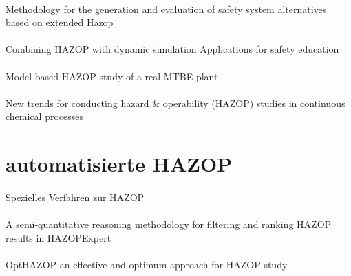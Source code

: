 \paragraph*{\cite{Ramzan_2007}} Methodology for the generation and evaluation of safety system alternatives based on extended Hazop

\paragraph*{\cite{Eizenberg_2006}} Combining {HAZOP} with dynamic simulation {\textemdash} Applications for safety education

\paragraph*{\cite{Labovsk__2007}} Model-based {HAZOP} study of a real {MTBE} plant

\paragraph*{\cite{Denti_2010}} New trends for conducting hazard \& operability (HAZOP) studies in continuous chemical processes

\section{automatisierte HAZOP}
\paragraph*{\cite{Vaidhyanathan_1995}} Spezielles Verfahren zur HAZOP

\paragraph*{\cite{Vaidhyanathan_1996}} A semi-quantitative reasoning methodology for filtering and ranking {HAZOP} results in {HAZOPExpert}

\paragraph*{\cite{Venkatasubramanian_2000}}

\paragraph*{\cite{Khan_1997}} {OptHAZOP }{\textemdash} an effective and optimum approach for {HAZOP} study

